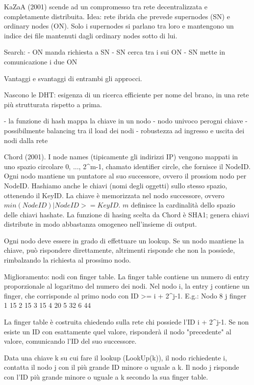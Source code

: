 KaZaA (2001) scende ad un compromesso tra rete decentralizzata e completamente distribuita.
Idea: rete ibrida che prevede supernodes (SN) e ordinary nodes (ON). Solo i supernodes si parlano tra loro e mantengono un indice dei file mantenuti
dagli ordinary nodes sotto di lui.

Search:
 - ON manda richiesta a SN
 - SN cerca tra i sui ON
 - SN mette in comunicazione i due ON

Vantaggi e svantaggi di entrambi gli approcci.

Nascono le DHT: esigenza di un ricerca efficiente per nome del brano, in una rete più strutturata rispetto a prima.

- la funzione di hash mappa la chiave in un nodo
- nodo univoco perogni chiave
- possibilmente balancing tra il load dei nodi
- robustezza ad ingresso e uscita dei nodi dalla rete

Chord (2001). I node names (tipicamente gli indirizzi IP) vengono mappati in uno spazio circolare {0, ..., 2^m-1}, chamato identifier circle, che fornisce
il NodeID. Ogni nodo mantiene un puntatore al suo successore, ovvero il prossiom nodo per NodeID.
Hashiamo anche le chiavi (nomi degli oggetti) sullo stesso spazio, ottenendo il KeyID.
La chiave è memorizzata nel nodo successore, ovvero $min(NodeID) | NodeID >= KeyID$.
$m$ definisce la cardinalità dello spazio delle chiavi hashate.
La funzione di hasing scelta da Chord è SHA1; genera chiavi distribute in modo abbastanza omogeneo nell'insieme di output.

Ogni nodo deve essere in grado di effettuare un lookup.
Se un nodo mantiene la chiave, può rispondere direttamente, altrimenti risponde che non la possiede, rimbalzando la richiesta al prossimo nodo.

Miglioramento: nodi con finger table.
La finger table contiene un numero di entry proporzionale al logaritmo del numero dei nodi.
Nel nodo i, la entry j contiene un finger, che corrisponde al primo nodo con ID >= i + 2^{j-1}.
E.g.: Nodo 8
j finger
1 15
2 15
3 15
4 20
5 32
6 44

La finger table è costruita chiedendo sulla rete chi possiede l'ID i + 2^{j-1}. Se non esiste un ID con esattamente quel valore, risponderà
il nodo "precedente" al valore, comunicando l'ID del suo successore.

Data una chiave k su cui fare il lookup (LookUp(k)), il nodo richiedente i, contatta il nodo j con il più grande ID minore o uguale a k.
Il nodo j risponde con l'ID più grande minore o uguale a k secondo la sua finger table.

